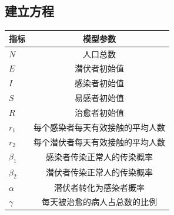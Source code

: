 \documentclass[lang=cn,11pt]{elegantpaper}
\begin{document}
\subsection{建立方程}
\begin{center}	
    \begin{tabular}{l c}
      \hline
      指标 & 模型参数 \\
      \hline
      $N$&人口总数    \\
      $E$&潜伏者初始值\\
      $I$&感染者初始值\\
      $S$&易感者初始值\\
      $R$& 治愈者初始值 \\
      $r_1$&每个感染者每天有效接触的平均人数\\
      $r_2$&每个潜伏者每天有效接触的平均人数\\
      $\beta_1$&感染者传染正常人的传染概率\\
      $\beta_2$&潜伏者传染正常人的传染概率\\
      $\alpha$&潜伏者转化为感染者概率 \\
      $\gamma$&每天被治愈的病人占总数的比例\\    
      \hline
    \end{tabular}
 \end{center}
 
\end{document}
